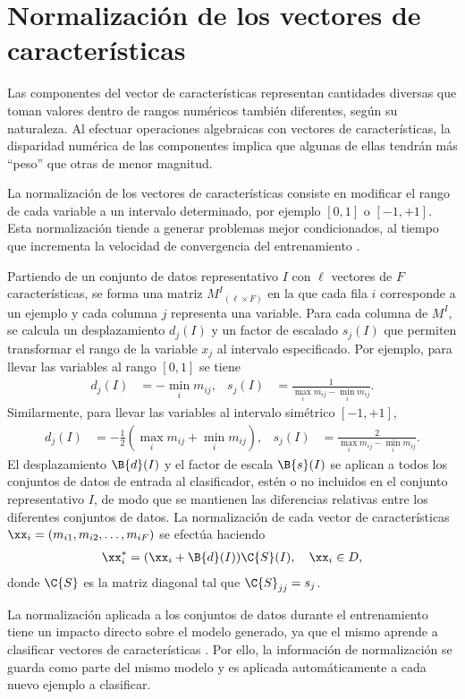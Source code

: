 %
%
%
\section{Normalización de los vectores de características}
%
Las componentes del vector de características representan cantidades
diversas que toman valores dentro de rangos numéricos también
diferentes, según su naturaleza.  Al efectuar operaciones algebraicas
con vectores de características, la disparidad numérica de las
componentes implica que algunas de ellas tendrán más ``peso'' que
otras de menor magnitud.

La normalización de los vectores de características consiste en
modificar el rango de cada variable a un intervalo determinado, por
ejemplo $[0,1]$ o $[-1,+1]$. Esta normalización tiende a generar
problemas mejor condicionados, al tiempo que incrementa la velocidad
de convergencia del entrenamiento \cite{nnfaq2}.

Partiendo de un conjunto de datos representativo $I$ con $\ell$
vectores de $F$ características, se forma una matriz
$M^I{}_{(\ell\times{}F)}$ en la que cada fila $i$ corresponde a un
ejemplo y cada columna $j$ representa una variable.  Para cada columna
de $M^I$, se calcula un desplazamiento $d_j(I)$ y un factor de
escalado $s_j(I)$ que permiten transformar el rango de la variable
$x_j$ al intervalo especificado. Por ejemplo, para llevar las
variables al rango $[0,1]$ se tiene
%
\begin{align}
  d_j(I) &= - \min_i m_{ij}, &
  s_j(I) &= \frac{1}{\max_i m_{ij} - \min_i m_{ij}}.
\end{align}
%
Similarmente, para llevar las variables al intervalo simétrico
$[-1,+1]$,
%
\begin{align}
  d_j(I) &= -\frac{1}{2}\left(\max_i m_{ij} + \min_i m_{ij}\right), &
  s_j(I) &= \frac{2}{\max_i m_{ij} - \min_i m_{ij}}.
\end{align}
%
El desplazamiento $\B{d}(I)$ y el factor de escala $\B{s}(I)$ se
aplican a todos los conjuntos de datos de entrada al clasificador,
estén o no incluidos en el conjunto representativo $I$, de modo que se
mantienen las diferencias relativas entre los diferentes conjuntos de
datos. La normalización de cada vector de características
$\xx_i=(m_{i1},m_{i2},\ldots,m_{iF})$ se efectúa haciendo
%
\begin{align}
  \xx_i^{*} = (\xx_i + \B{d}(I)) \C{S}(I),\quad \xx_i\in D,
\end{align}
%
donde $\C{S}$ es la matriz diagonal tal que $\C{S}_{jj}=s_j$.

La normalización aplicada a los conjuntos de datos durante el
entrenamiento tiene un impacto directo sobre el modelo generado, ya
que el mismo aprende a clasificar vectores de características
.  Por ello, la información de normalización se guarda
como parte del mismo modelo y es aplicada automáticamente a cada nuevo
ejemplo a clasificar.
